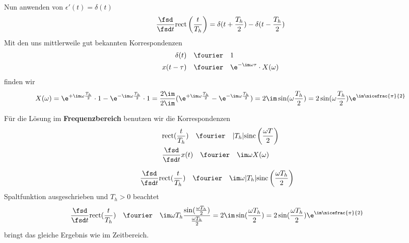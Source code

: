 \begin{ExCalc}
Nun anwenden von $\epsilon'(t) = \delta(t)$
\begin{equation}
\frac{\fsd}{\fsd t} \mathrm{rect}\left(\frac{t}{T_h}\right) = \delta(t+\frac{T_h}{2}) - \delta(t-\frac{T_h}{2})
\end{equation}
Mit den uns mittlerweile gut bekannten Korrespondenzen
\begin{align}
\delta(t) &\quad \fourier \quad 1\\
x(t-\tau) &\quad \fourier \quad \e^{-\im\omega\tau} \cdot X(\omega)
\end{align}
finden wir
\begin{equation}
X(\omega) = \e^{+\im\omega\frac{T_h}{2}}\cdot 1 - \e^{-\im\omega\frac{T_h}{2}}\cdot 1
= \frac{2\im}{2\im}(\e^{+\im\omega\frac{T_h}{2}} - \e^{-\im\omega\frac{T_h}{2}})
= 2\im \sin(\omega\frac{T_h}{2})
= 2\sin(\omega\frac{T_h}{2}) \e^{\im \nicefrac{\pi}{2}}
\end{equation}
\end{ExCalc}

\begin{Ansatz}
Für die Lösung im \textbf{Frequenzbereich} benutzen wir die Korrespondenzen
\begin{align}
&\mathrm{rect}(\frac{t}{T_h}) \quad \fourier \quad |T_h| \mathrm{sinc}\left(\frac{\omega T}{2}\right)\\
&\frac{\fsd}{\fsd t} x(t) \quad\fourier\quad \im\omega X(\omega)
\end{align}
\end{Ansatz}

\begin{ExCalc}
\begin{align}
\frac{\fsd}{\fsd t} \mathrm{rect}(\frac{t}{T_h}) &\quad \fourier \quad \im\omega |T_h| \mathrm{sinc}\left(\frac{\omega T_h}{2}\right)
\end{align}
Spaltfunktion ausgeschrieben und $T_h>0$ beachtet
\begin{align}
\frac{\fsd}{\fsd t} \mathrm{rect}(\frac{t}{T_h}) &\quad \fourier \quad \im\omega T_h \frac{\sin (\frac{\omega T_h}{2})}{\frac{\omega T_h}{2}}
=2\im\sin (\frac{\omega T_h}{2})
=2\sin(\frac{\omega T_h}{2}) \e^{\im \nicefrac{\pi}{2}}
\end{align}
bringt das gleiche Ergebnis wie im Zeitbereich.
\end{ExCalc}


